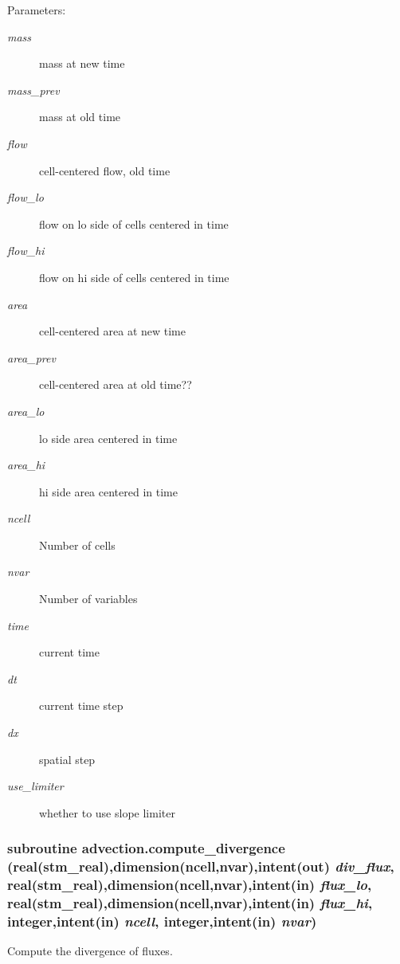 \begin{Desc}
\item[Parameters:]
\begin{description}
\item[{\em mass}]mass at new time\item[{\em mass\_\-prev}]mass at old time\item[{\em flow}]cell-centered flow, old time\item[{\em flow\_\-lo}]flow on lo side of cells centered in time\item[{\em flow\_\-hi}]flow on hi side of cells centered in time\item[{\em area}]cell-centered area at new time\item[{\em area\_\-prev}]cell-centered area at old time??\item[{\em area\_\-lo}]lo side area centered in time\item[{\em area\_\-hi}]hi side area centered in time\item[{\em ncell}]Number of cells\item[{\em nvar}]Number of variables\item[{\em time}]current time\item[{\em dt}]current time step\item[{\em dx}]spatial step\item[{\em use\_\-limiter}]whether to use slope limiter \end{description}
\end{Desc}
\hypertarget{a00049_aa34a3af6ce02dba4b6a11c1b38f51f0}{
\subsubsection[{compute\_\-divergence}]{\setlength{\rightskip}{0pt plus 5cm}subroutine advection.compute\_\-divergence (real(stm\_\-real),dimension(ncell,nvar),intent(out) {\em div\_\-flux}, \/  real(stm\_\-real),dimension(ncell,nvar),intent(in) {\em flux\_\-lo}, \/  real(stm\_\-real),dimension(ncell,nvar),intent(in) {\em flux\_\-hi}, \/  integer,intent(in) {\em ncell}, \/  integer,intent(in) {\em nvar})}}
\label{a00049_aa34a3af6ce02dba4b6a11c1b38f51f0}


Compute the divergence of fluxes. 

